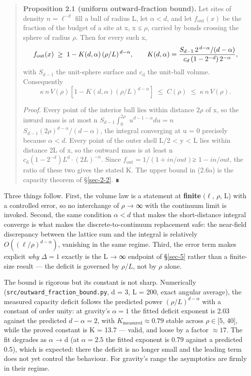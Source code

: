 \documentclass[12pt]{iopart}
\begin{document}
\begin{quote}
\textbf{Proposition 2.1 (uniform outward-fraction bound).} Let sites of
density \(n = \ell ^{-d}\) fill a ball of radius L, let \(\alpha  < d\),
and let \(f_{\mathrm{out}}(x)\) be the fraction of the budget of a site
at x, \textbar x\textbar{} ≤ \(\rho\), carried by bonds crossing the
sphere of radius \(\rho\). Then for every such x,
\[f_{\rm out}(x) \;\ge\; 1 - K(d,\alpha)\,(\rho/L)^{\,d-\alpha}, \qquad
K(d,\alpha) = \frac{S_{d-1}\,2^{\,d-\alpha}/(d-\alpha)}{c_d\,(1-2^{-d})\,2^{-\alpha}},\]
with \(S_{d-1}\) the unit-sphere surface and \(c_{\mathrm{d}}\) the
unit-ball volume. Consequently
\[\kappa\,n\,V(\rho)\left[1 - K(d,\alpha)(\rho/L)^{d-\alpha}\right] \;\le\; C(\rho) \;\le\; \kappa\,n\,V(\rho). \tag{2.6a}\]

\emph{Proof.} Every point of the interior ball lies within distance
\(2\rho\) of x, so the inward mass is at most n
\(S_{d-1}\)\(∫_{0}^{2\rho }\) \(u^{d-1-\alpha }du = n\)
\(S_{d-1}(2\rho )^{d-\alpha }/(d-\alpha )\), the integral converging at
u = 0 precisely because \(\alpha  < d\). Every point of the outer shell
L/2 \textless{} \textbar y\textbar{} \textless{} L lies within distance
2L of x, so the outward mass is at least n
\(c_{\mathrm{d}}(1-2^{-d})L^{d}\cdot (2L)^{-\alpha }\). Since
\(f_{\mathrm{out}} = 1/(1 + in/out)\)≥ \(1 - in/out\), the ratio of
these two gives the stated K. The upper bound in (2.6a) is the capacity
theorem of §\ref{sec-2-2}. ∎
\end{quote}

Three things follow. First, the volume law is a statement at
\textbf{finite} \((\ell\), \(\rho\), L) with a controlled error, so no
interchange of \(\rho\) → ∞ with the continuum limit is invoked. Second,
the same condition \(\alpha  < d\) that makes the short-distance
integral converge is what makes the discrete-to-continuum replacement
safe: the near-field discrepancy between the lattice sum and the
integral is relatively \(O((\ell /\rho )^{d-\alpha })\), vanishing in
the same regime. Third, the error term makes explicit \emph{why}
\(\Delta  = 1\) exactly is the L → ∞ endpoint of §\ref{sec-5} rather
than a finite-size result --- the deficit is governed by \(\rho /L\),
not by \(\rho\) alone.

The bound is rigorous but its constant is not sharp. Numerically
(\texttt{src/outward\_fraction\_bound.py}, d = 3, L = 200, exact angular
average), the measured capacity deficit follows the predicted power
\((\rho /L)^{d-\alpha }\) with a constant of order unity: at gravity's
\(\alpha  = 1\) the fitted deficit exponent is 2.03 against the
predicted \(d - \alpha  = 2\), with
\(K_{\mathrm{measured}} \approx  0.79\) stable across \(\rho  \in  [5\),
40{]}, while the proved constant is K = 13.7 --- valid, and loose by a
factor \(\approx  17\). The fit degrades as \(\alpha\) → d (at
\(\alpha  = 2.5\) the fitted exponent is 0.79 against a predicted 0.5),
which is expected: there the deficit is no longer small and the leading
term does not yet control the behaviour. For gravity's range the
asymptotics are firmly in their regime.
\end{document}
